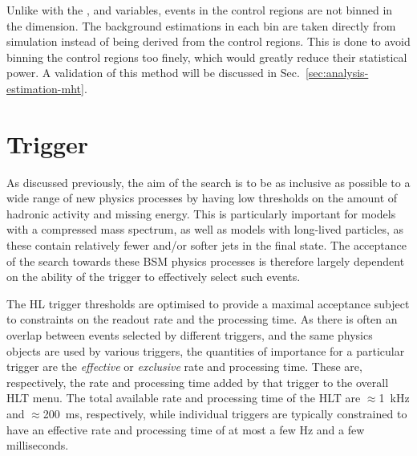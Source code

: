Unlike with the \njet, \nb and \scalht variables, events in the control regions 
are not binned in the \mht dimension. The background estimations in each \mht 
bin are taken directly from simulation instead of being derived from the 
control regions. This is done to avoid binning the control regions too finely, 
which %
would greatly reduce their 
statistical power. A validation of this method will be discussed in 
Sec.~\ref{sec:analysis-estimation-mht}.



\section{Trigger}
\label{sec:analysis-trigger}

As discussed previously, %
the aim of the search is to be as inclusive as possible to a wide range of new 
physics processes by having low thresholds on the amount of hadronic activity 
and missing energy. This is particularly important for models with a compressed 
mass spectrum, as well as models with long-lived particles, as these contain 
relatively fewer and/or softer jets in the final state. The acceptance of the 
search towards these BSM physics processes is therefore largely dependent on 
the ability of the trigger to effectively select such events. 

The HL trigger thresholds are optimised to provide a maximal acceptance 
subject to 
constraints on the readout rate and the processing time. As there is often an 
overlap between events selected by different triggers, and the same physics 
objects are used by various triggers, the quantities of importance for a 
particular trigger are the \textit{effective} or \textit{exclusive} rate and 
processing time. These 
are, respectively, the rate and processing time added by that trigger to the 
overall HLT menu. The total available rate and processing time of the HLT are 
$\approx$1~kHz and $\approx$200~ms, respectively, while individual triggers are 
typically constrained to have an effective rate and processing time of at most 
a few Hz and a few milliseconds.

